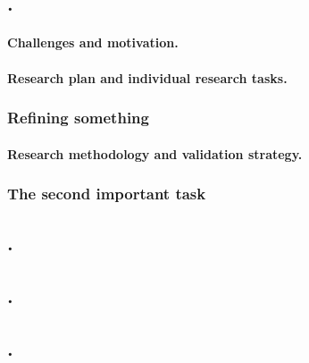 \documentclass[11pt]{article}
\begin{document}
\let\oldthesubsection=\thesubsection
\def\thesubsection{WP\arabic{wp}}
\def\package#1{\addtocounter{wp}{1}\subsection{#1}}

\let\oldthesubsubsection=\thesubsubsection
\def\thesubsubsection{\thesubsection.\arabic{subsubsection}}
\let\task=\subsubsection

\package{\WPone.}
\label{wp:something}

\paragraph{Challenges and motivation.}

\paragraph{Research plan and individual research tasks.}

\task{Refining something}
\label{task-wp1-1}

\paragraph{Research methodology and validation strategy.}

\task{The second important task}
\label{task-wp1-2}

\package{\WPtwo.}
\label{wp:work-something}

\package{\WPthree.}
\label{wp:do-this}

\package{\WPfour.}
\label{wp:do-that}


\let\thesubsection=\oldthesubsection
\let\thesubsubsection=\oldthesubsubsection
\setcounter{subsection}{3}
\end{document}
